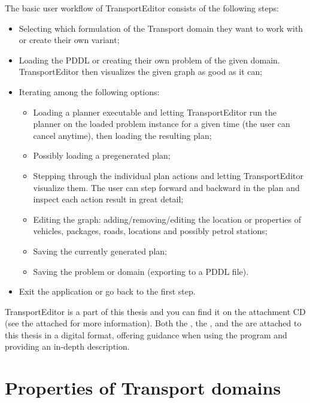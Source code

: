 The basic user workflow of TransportEditor consists of the following steps:
\begin{itemize}
\item Selecting which formulation of the Transport domain they want to work with or create their own variant;
\item Loading the PDDL or creating their own problem of the given domain. TransportEditor then visualizes the given graph as good as it can;
\item Iterating among the following options:
\begin{itemize}
\item Loading a planner executable and letting TransportEditor run the planner on the loaded problem instance for a given time (the user can cancel anytime),
then loading the resulting plan;
\item Possibly loading a pregenerated plan;
\item Stepping through the individual plan actions and letting TransportEditor visualize them.
The user can step forward and backward in the plan and inspect each action result in great detail;
\item Editing the graph: adding/removing/editing the location or properties of vehicles, packages, roads, locations and possibly petrol stations;
\item Saving the currently generated plan;
\item Saving the problem or domain (exporting to a PDDL file).
\end{itemize}
\item Exit the application or go back to the first step.
\end{itemize}

TransportEditor is a part of this thesis and you can find it on the attachment CD (see the attached  for more information). Both the ,
the , and the  are attached to this thesis in a digital format, offering guidance when
using the program and providing an in-depth description.
















\section{Properties of Transport domains}

